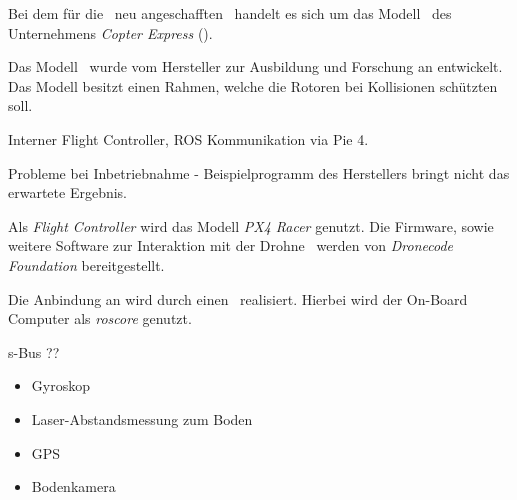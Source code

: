 
Bei dem für die \DHBW\ neu angeschafften \Quad\ handelt es sich um das Modell \Clover\ des Unternehmens \textit{Copter Express} (\COEX).

Das Modell \Clover\ wurde vom Hersteller zur Ausbildung und Forschung an \Quad[n] entwickelt. Das Modell besitzt einen Rahmen, welche die Rotoren bei Kollisionen schützten soll.




Interner Flight Controller, ROS Kommunikation via Pie 4.




Probleme bei Inbetriebnahme - Beispielprogramm des Herstellers bringt nicht das erwartete Ergebnis.




Als \textit{Flight Controller} wird das Modell \textit{PX4 Racer} genutzt. Die Firmware, sowie weitere Software zur Interaktion mit der Drohne \Clover\ werden von \textit{Dronecode Foundation} bereitgestellt.

Die Anbindung an \ROS wird durch einen \Pie\ realisiert. Hierbei wird der On-Board Computer als \textit{roscore} genutzt.


s-Bus ??








\begin{itemize}
\item Gyroskop
\item Laser-Abstandsmessung zum Boden
\item GPS
\item Bodenkamera
\end{itemize}





















